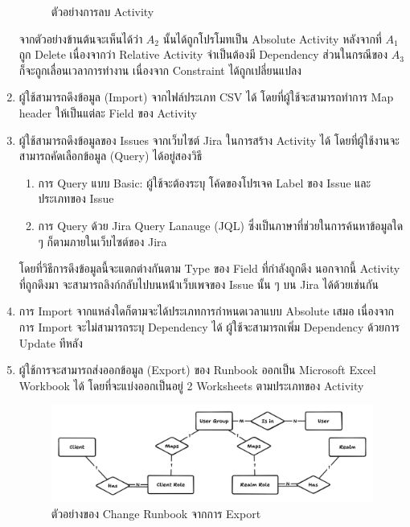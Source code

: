 \begin{enumerate}
\begin{figure} [H]
\begin{center}
        \end{center}
        \caption[ตัวอย่างการลบ Activity]{ตัวอย่างการลบ Activity}
        \label{fig:update activity example 5}
    \end{figure}
    จากตัวอย่างข้านต้นจะเห็นได้ว่า $A_2$ นั้นได้ถูกโปรโมทเป็น Absolute Activity หลังจากที่ $A_1$ ถูก Delete เนื่องจากว่า Relative Activity จำเป็นต้องมี Dependency ส่วนในกรณีของ $A_3$ ก็จะถูกเลื่อนเวลาการทำงาน เนื่องจาก Constraint ได้ถูกเปลี่ยนแปลง
    \item ผู้ใช้สามารถดึงข้อมูล (Import) จากไฟล์ประเภท CSV ได้ โดยที่ผู้ใช้จะสามารถทำการ Map header ให้เป็นแต่ละ Field ของ Activity
    \item ผู้ใช้สามารถดึงข้อมูลของ Issues จากเว็บไซต์ Jira ในการสร้าง​ Activity ได้ โดยที่ผู้ใช้งานจะสามารถคัดเลือกข้อมูล (Query) ได้อยู่สองวิธี
    \begin{enumerate}
        \item การ Query แบบ Basic: ผู้ใช้จะต้องระบุ โค้ดของโปรเจค Label ของ Issue และ ประเภทของ Issue
        \item การ Query ด้วย Jira Query Lanauge (JQL) ซึ่งเป็นภาษาที่ช่วยในการค้นหาข้อมูลใด ๆ ก็ตามภายในเว็บไซต์ของ Jira
    \end{enumerate}
    โดยที่วิธีการดึงข้อมูลนี้จะแตกต่างกันตาม Type ของ Field ที่กำลังถูกดึง นอกจากนี้ Activity ที่ถูกดึงมา จะสามารถลิงก์กลับไปบนหน้่าเว็บเพจของ Issue นั้น ๆ บน Jira ได้ด้วยเช่นกัน
    \item การ Import จากแหล่งใดก็ตามจะได้ประเภทการกำหนดเวลาแบบ Absolute เสมอ เนื่องจากการ Import จะไม่สามารถระบุ Dependency ได้ ผู้ใช้จะสามารถเพิ่ม Dependency ด้วยการ Update ทีหลัง
    \item ผู้ใช้การจะสามารถส่งออกข้อมูล (Export) ของ Runbook ออกเป็น Microsoft Excel Workbook ได้ โดยที่จะแบ่งออกเป็นอยู่ 2 Worksheets ตามประเภทของ Activity
    
    \begin{figure}[H]
        \begin{center}
            \includegraphics[scale=0.29]{resources/keycloak-er.png}
        \end{center}
        \caption[ตัวอย่างของ Change Runbook จากการ Export]{ตัวอย่างของ Change Runbook จากการ Export}
        \label{fig:keycloak-er}
    \end{figure}

\end{enumerate}

